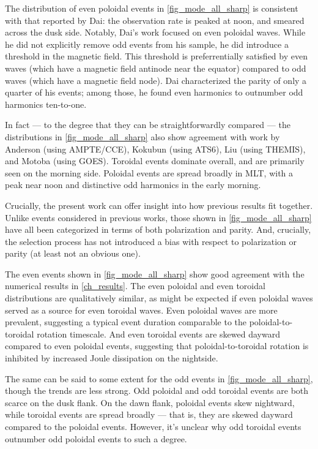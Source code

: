 The distribution of even poloidal events in \cref{fig_mode_all_sharp} is
consistent with that reported by Dai\cite{dai_2015}: the observation rate is
peaked at noon, and smeared across the dusk side. Notably, Dai's work focused
on even poloidal waves. While he did not explicitly remove odd events from his
sample, he did introduce a threshold in the magnetic field. This threshold is
preferrentially satisfied by even waves (which have a magnetic field antinode
near the equator) compared to odd waves (which have a magnetic field node). Dai
characterized the parity of only a quarter of his events; among those, he found
even harmonics to outnumber odd harmonics ten-to-one. 

In fact --- to the degree that they can be straightforwardly compared --- the
distributions in \cref{fig_mode_all_sharp} also show agreement with work by
Anderson\cite{anderson_1990} (using AMPTE/CCE), Kokubun\cite{kokubun_1989}
(using ATS6), Liu\cite{liu_2009} (using THEMIS), and Motoba\cite{motoba_2015}
(using GOES). Toroidal events dominate overall, and are primarily seen on the
morning side. Poloidal events are spread broadly in MLT, with a peak near noon
and distinctive odd harmonics in the early morning. 

Crucially, the present work can offer insight into how previous results fit
together. Unlike events considered in previous works, those shown in
\cref{fig_mode_all_sharp} have all been categorized in terms of both
polarization and parity. And, crucially, the selection process has not
introduced a bias with respect to polarization or parity (at least not an
obvious one). 

The even events shown in \cref{fig_mode_all_sharp} show good agreement with the
numerical results in \cref{ch_results}. The even poloidal and even toroidal
distributions are qualitatively similar, as might be expected if even poloidal
waves served as a source for even toroidal waves. Even poloidal waves are more
prevalent, suggesting a typical event duration comparable to the
poloidal-to-toroidal rotation timescale. And even toroidal events are skewed
dayward compared to even poloidal events, suggesting that poloidal-to-toroidal
rotation is inhibited by increased Joule dissipation on the nightside. 

The same can be said to some extent for the odd events in
\cref{fig_mode_all_sharp}, though the trends are less strong. Odd poloidal and
odd toroidal events are both scarce on the dusk flank. On the dawn flank,
poloidal events skew nightward, while toroidal events are spread broadly ---
that is, they are skewed dayward compared to the poloidal events. However, it's
unclear why odd toroidal events outnumber odd poloidal events to such a degree. 

